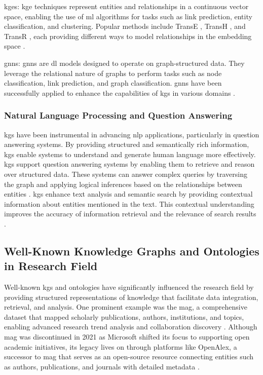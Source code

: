 \glspl{kge}: \gls{kge} techniques represent entities and relationships in a continuous vector space, enabling the use of \gls{ml} algorithms for tasks such as link prediction, entity classification, and clustering. Popular methods include TransE \cite{Bordes2013}, TransH \cite{Wang2014}, and TransR \cite{Lin2015}, each providing different ways to model relationships in the embedding space \cite{Wang2017}.

\glspl{gnn}: \glspl{gnn} are \gls{dl} models designed to operate on graph-structured data. They leverage the relational nature of graphs to perform tasks such as node classification, link prediction, and graph classification. \glspl{gnn} have been successfully applied to enhance the capabilities of \glspl{kg} in various domains \cite{Wu2021}.

\subsubsection*{Natural Language Processing and Question Answering}
\glspl{kg} have been instrumental in advancing \gls{nlp} applications, particularly in question answering systems. By providing structured and semantically rich information, \glspl{kg} enable systems to understand and generate human language more effectively.
\glspl{kg} support question answering systems by enabling them to retrieve and reason over structured data.
These systems can answer complex queries by traversing the graph and applying logical inferences based on the relationships between entities \cite{Yasunaga2021}.
\glspl{kg} enhance text analysis and semantic search by providing contextual information about entities mentioned in the text.
This contextual understanding improves the accuracy of information retrieval and the relevance of search results \cite{Fernandez2011}.

\subsection*{Well-Known Knowledge Graphs and Ontologies in Research Field}
Well-known \glspl{kg} and ontologies have significantly influenced the research field by providing structured representations of knowledge that facilitate data integration, retrieval, and analysis.
One prominent example was the \gls{mag}, a comprehensive dataset that mapped scholarly publications, authors, institutions, and topics, enabling advanced research trend analysis and collaboration discovery \cite{Wang2020}.
Although \gls{mag} was discontinued in 2021 as Microsoft shifted its focus to supporting open academic initiatives, its legacy lives on through platforms like OpenAlex, a successor to \gls{mag} that serves as an open-source resource connecting entities such as authors, publications, and journals with detailed metadata \cite{priem2022}.

